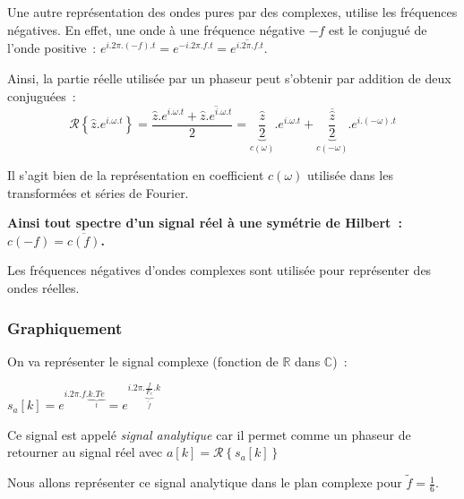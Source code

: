 \documentclass[a4paper,twoside,12pt]{report}           %
\begin{document}
Une autre représentation des ondes pures par des complexes, utilise
les fréquences négatives. En effet, une onde à une fréquence négative
$-f$ est le conjugué de l'onde positive~:
$e^{i.2\pi.(-f).t}=e^{-i.2\pi.f.t}=\overline{e^{i.2\pi.f.t}}$.

Ainsi, la partie réelle utilisée par un phaseur peut s'obtenir par
addition de deux conjuguées~:
\begin{equation}
  \label{eq:cn}
  \mathcal{R}\left\{\hat{z}.e^{i.\omega.t}\right\}=\frac{\hat{z}.e^{i.\omega.t}+\overline{\hat{z}.e^{i.\omega.t}}}{2} = \underbrace{\frac{\hat{z}}{2}}_{c(\omega)}.e^{i.\omega.t} + \underbrace{\frac{\overline{\hat{z}}}{2}}_{c(-\omega)}.e^{i.(-\omega).t}
\end{equation}

Il s'agit bien de la représentation en coefficient $c(\omega)$
utilisée dans les transformées et séries de Fourier.

\textbf{Ainsi tout spectre d'un signal réel à une symétrie de
  Hilbert~: $c(-f)=\overline{c(f)}$.}

Les fréquences négatives d'ondes complexes sont utilisée pour
représenter des ondes réelles.

\subsubsection{Graphiquement}

On va représenter le signal complexe (fonction de $\mathbb{R}$ dans
$\mathbb{C}$)~:
 
$s_a[k]=e^{i.2\pi.f.\underbrace{k.Te}_{t}}=e^{i.2\pi.\underbrace{\frac{f}{F_e}}_{\widetilde{f}}.k}$

Ce signal est appelé \emph{signal analytique} car il permet comme un
phaseur de retourner au signal réel avec
$a[k]=\mathcal{R}\left\{s_a[k]\right\}$

Nous allons représenter ce signal analytique dans le plan complexe
pour $\widetilde{f}=\frac{1}{6}$.
   
\end{document}
